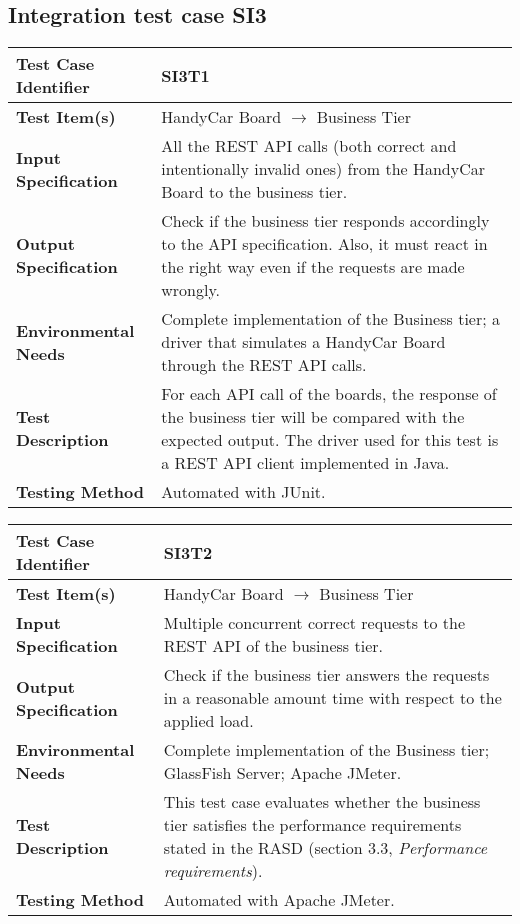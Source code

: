 \vspace{2em}

\subsection{Integration test case SI3}
\label{sec:performance-business}

\begin{tabular}{l p{}}
    \hline
    \textbf{Test Case Identifier} & SI3T1\\
    \hline
    \textbf{Test Item(s)} & HandyCar Board $\rightarrow$ Business Tier\\
    \hline
    \textbf{Input Specification} & All the REST API calls (both correct and intentionally invalid ones) from the HandyCar Board to the business tier.\\
    \hline
    \textbf{Output Specification} & Check if the business tier responds accordingly to the API specification. Also, it must react in the right way even if the requests are made wrongly.\\
    \hline
    \textbf{Environmental Needs} & Complete implementation of the Business tier; a driver that simulates a HandyCar Board through the REST API calls. \\
    \hline
    \textbf{Test Description} & For each API call of the boards, the response of the business tier will be compared with the expected output. The driver used for this test is a REST API client implemented in Java.\\
    \hline
    \textbf{Testing Method} & Automated with JUnit.\\
    \hline
\end{tabular}

\vspace{2em}

\noindent\begin{tabular}{l p{}}
    \hline
    \textbf{Test Case Identifier} & SI3T2\\
    \hline
    \textbf{Test Item(s)} & HandyCar Board $\rightarrow$ Business Tier\\
    \hline
    \textbf{Input Specification} & Multiple concurrent correct requests to the REST API of the business tier.\\
    \hline
    \textbf{Output Specification} & Check if the business tier answers the requests in a reasonable amount time with respect to the applied load. \\
    \hline
    \textbf{Environmental Needs} & Complete implementation of the Business tier; GlassFish Server; Apache JMeter.\\
    \hline
    \textbf{Test Description} & This test case evaluates whether the business tier satisfies the performance requirements stated in the RASD (section 3.3, \emph{Performance requirements}).\\
    \hline
    \textbf{Testing Method} & Automated with Apache JMeter. \\
    \hline
\end{tabular}

